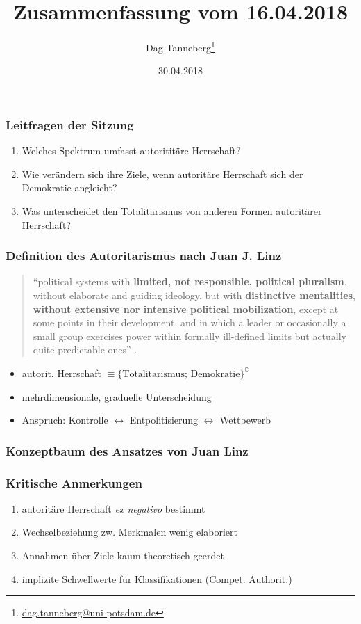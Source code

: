 \documentclass{beamer}
\title{Zusammenfassung vom 16.04.2018}
\author{Dag Tanneberg\thanks{%
  \href{mailto:dag.tanneberg@uni-potsdam.de}%
    {dag.tanneberg@uni-potsdam.de}
  }
}
\institute[Universität Potsdam]{
  {\glqq}Wie erkl\"art man autorit\"are Herrschaft?{\grqq}\\
  Universität Potsdam\\
  Lehrstuhl für Vergleichende Politikwissenschaft\\
  Sommersemester 2018
}
\date{30.04.2018}
\begin{document}
\maketitle

\begin{frame}
  \frametitle{Leitfragen der Sitzung}
  \begin{enumerate}
    \item Welches Spektrum umfasst autorititäre Herrschaft?
    \item Wie verändern sich ihre Ziele, wenn autoritäre Herrschaft sich der Demokratie angleicht?
    \item Was unterscheidet den Totalitarismus von anderen Formen autoritärer Herrschaft?
  \end{enumerate}
\end{frame}

\begin{frame}
  \frametitle{Definition des Autoritarismus nach Juan J. Linz}
  \begin{quote}
    \normalfont
    \small
    ``political systems with \textbf{limited, not responsible,
    political pluralism}, without elaborate and guiding
    ideology, but with \textbf{distinctive mentalities},
    \textbf{without extensive nor intensive political mobilization},
    except at some points in their development, and in which
    a leader or occasionally a small group exercises power
    within formally ill-defined limits but actually quite
    predictable ones''
    \newline \newline
    \footnotesize{}.
  \end{quote}
  \begin{itemize}
    \item autorit. Herrschaft $\equiv \{\text{Totalitarismus; Demokratie}\}^\complement$
    \item mehrdimensionale, graduelle Unterscheidung
    \item Anspruch: Kontrolle $\leftrightarrow$ Entpolitisierung $\leftrightarrow$ Wettbewerb
  \end{itemize}
\end{frame}

\begin{frame}
  \frametitle{Konzeptbaum des Ansatzes von Juan Linz}
  \begin{figure}[t]
    
  \end{figure}
\end{frame}

\begin{frame}
  \frametitle{Kritische Anmerkungen}
  \begin{enumerate}
    \item autoritäre Herrschaft \textit{ex negativo} bestimmt
    \item Wechselbeziehung zw. Merkmalen wenig elaboriert
    \item Annahmen über Ziele kaum theoretisch geerdet
    \item implizite Schwellwerte für Klassifikationen (Compet. Authorit.)
  \end{enumerate}
\end{frame}
\end{document}
